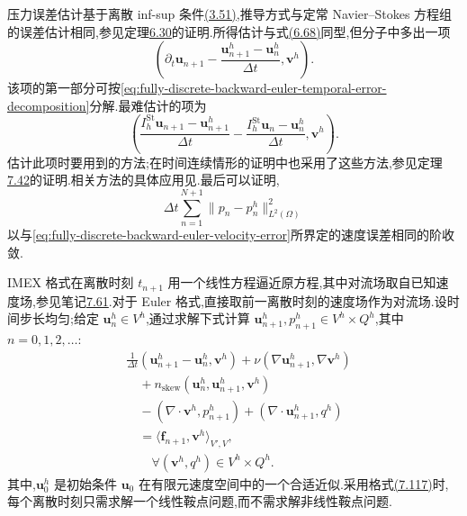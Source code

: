 \begin{note}[压力误差分析]\label{note:fully-discrete-backward-euler-pressure-error}
压力误差估计基于离散 inf-sup 条件\hyperref[eq:discrete-infsup-condition]{(3.51)},推导方式与定常 Navier--Stokes 方程组的误差估计相同,参见定理\hyperref[thm:steady-ns-fem-error-pressure]{6.30}的证明.所得估计与式\hyperref[eq:steady-ns-pressure-error-infsup]{(6.68)}同型,但分子中多出一项
\[
 \left(\partial_t\bm{u}_{n+1}
   -\frac{\bm{u}_{n+1}^h-\bm{u}_n^h}{\Delta t},\bm{v}^h\right).
\]
该项的第一部分可按\cref{eq:fully-discrete-backward-euler-temporal-error-decomposition}分解.最难估计的项为
\[
 \left(\frac{I_h^{\mathrm{St}}\bm{u}_{n+1}-\bm{u}_{n+1}^h}{\Delta t}
   -\frac{I_h^{\mathrm{St}}\bm{u}_n-\bm{u}_n^h}{\Delta t},
   \bm{v}^h\right).
\]
估计此项时要用到\textcite{AyusoGarciaArchillaNovo2005}的方法;在时间连续情形的证明中也采用了这些方法,参见定理\hyperref[thm:time-dependent-fem-pressure-error]{7.42}的证明.相关方法的具体应用见\textcite{deFrutos2016b}.最后可以证明,
\[
 \Delta t\sum_{n=1}^{N+1}\|p_n-p_n^h\|_{L^2(\Omega)}^2
\]
以与\cref{eq:fully-discrete-backward-euler-velocity-error}所界定的速度误差相同的阶收敛.
\end{note}

\begin{note}\label{note:imex-euler-scheme}
IMEX 格式在离散时刻 $t_{n+1}$ 用一个线性方程逼近原方程,其中对流场取自已知速度场,参见笔记\hyperref[note:imex-schemes]{7.61}.对于 Euler 格式,直接取前一离散时刻的速度场作为对流场.设时间步长均匀;给定 $\bm{u}_n^h\in V^h$,通过求解下式计算 $\bm{u}_{n+1}^h,p_{n+1}^h\in V^h\times Q^h$,其中 $n=0,1,2,\ldots$:
\begin{equation}\label{eq:imex-euler-fully-discrete-scheme}
\begin{aligned}
 &\frac1{\Delta t}(\bm{u}_{n+1}^h-\bm{u}_n^h,\bm{v}^h)
  +\nu(\nabla\bm{u}_{n+1}^h,\nabla\bm{v}^h)\\
 &\quad+n_{\mathrm{skew}}(\bm{u}_n^h,\bm{u}_{n+1}^h,\bm{v}^h)\\
 &\quad-(\nabla\cdot\bm{v}^h,p_{n+1}^h)
  +(\nabla\cdot\bm{u}_{n+1}^h,q^h)\\
 &\quad=\langle\bm{f}_{n+1},\bm{v}^h\rangle_{V',V},\\
 &\qquad\forall(\bm{v}^h,q^h)\in V^h\times Q^h.
\end{aligned}
\end{equation}
其中,$\bm{u}_0^h$ 是初始条件 $\bm{u}_0$ 在有限元速度空间中的一个合适近似.采用格式\hyperref[eq:imex-euler-fully-discrete-scheme]{(7.117)}时,每个离散时刻只需求解一个线性鞍点问题,而不需求解非线性鞍点问题.
\end{note}

